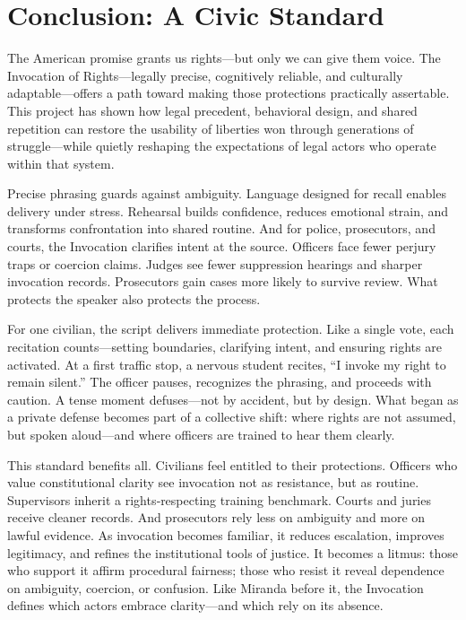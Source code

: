 \section{Conclusion: A Civic Standard}

The American promise grants us rights—but only we can give them voice. The Invocation of Rights—legally precise, cognitively reliable, and culturally adaptable—offers a path toward making those protections practically assertable. This project has shown how legal precedent, behavioral design, and shared repetition can restore the usability of liberties won through generations of struggle—while quietly reshaping the expectations of legal actors who operate within that system.

Precise phrasing guards against ambiguity. Language designed for recall enables delivery under stress. Rehearsal builds confidence, reduces emotional strain, and transforms confrontation into shared routine. And for police, prosecutors, and courts, the Invocation clarifies intent at the source. Officers face fewer perjury traps or coercion claims. Judges see fewer suppression hearings and sharper invocation records. Prosecutors gain cases more likely to survive review. What protects the speaker also protects the process.

For one civilian, the script delivers immediate protection. Like a single vote, each recitation counts—setting boundaries, clarifying intent, and ensuring rights are activated. At a first traffic stop, a nervous student recites, ``I invoke my right to remain silent.'' The officer pauses, recognizes the phrasing, and proceeds with caution. A tense moment defuses—not by accident, but by design. What began as a private defense becomes part of a collective shift: where rights are not assumed, but spoken aloud—and where officers are trained to hear them clearly.

This standard benefits all. Civilians feel entitled to their protections. Officers who value constitutional clarity see invocation not as resistance, but as routine. Supervisors inherit a rights‑respecting training benchmark. Courts and juries receive cleaner records. And prosecutors rely less on ambiguity and more on lawful evidence. As invocation becomes familiar, it reduces escalation, improves legitimacy, and refines the institutional tools of justice. It becomes a litmus: those who support it affirm procedural fairness; those who resist it reveal dependence on ambiguity, coercion, or confusion. Like Miranda before it, the Invocation defines which actors embrace clarity—and which rely on its absence.

